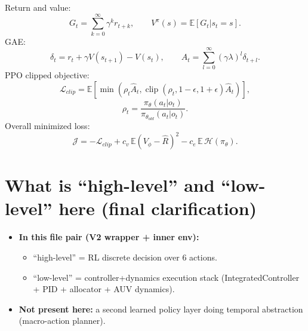 \documentclass[11pt]{article}
\begin{document}
Return and value:
\begin{equation}
G_t=\sum_{k=0}^{\infty}\gamma^k r_{t+k},\qquad V^\pi(s)=\mathbb{E}[G_t|s_t=s].
\end{equation}
GAE:
\begin{equation}
\delta_t=r_t+\gamma V(s_{t+1})-V(s_t),\qquad
\hat A_t=\sum_{l=0}^{\infty}(\gamma\lambda)^l\delta_{t+l}.
\end{equation}
PPO clipped objective:
\begin{equation}
\mathcal{L}_{clip}=\mathbb{E}\left[\min\left(\rho_t\hat A_t,\operatorname{clip}(\rho_t,1-\epsilon,1+\epsilon)\hat A_t\right)\right],
\end{equation}
\begin{equation}
\rho_t=\frac{\pi_\theta(a_t|o_t)}{\pi_{\theta_{old}}(a_t|o_t)}.
\end{equation}
Overall minimized loss:
\begin{equation}
\mathcal{J}= -\mathcal{L}_{clip}+c_v\,\mathbb{E}(V_\phi-\hat R)^2-c_e\,\mathbb{E}\,\mathcal{H}(\pi_\theta).
\end{equation}

\section{What is ``high-level'' and ``low-level'' here (final clarification)}
\begin{itemize}
  \item \textbf{In this file pair (V2 wrapper + inner env):}
  \begin{itemize}
    \item ``high-level'' = RL discrete decision over 6 actions.
    \item ``low-level'' = controller+dynamics execution stack (IntegratedController + PID + allocator + AUV dynamics).
  \end{itemize}
  \item \textbf{Not present here:} a second learned policy layer doing temporal abstraction (macro-action planner).
\end{itemize}
\end{document}
